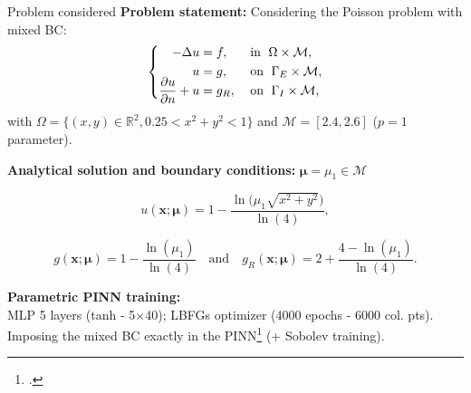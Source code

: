 \begin{frame}{Problem considered} 
	\textbf{Problem statement:} Considering the Poisson problem with mixed BC:
	\vspace{-5pt}
	\begin{equation*}
		\left\{
		\begin{aligned}
			-\Delta u & = f, \; &  & \text{in } \; \Omega \times \mathcal{M}, \\
			u         & = g, \;  &  & \text{on } \; \Gamma_E \times \mathcal{M}, \\
			\smash{\frac{\partial u}{\partial n}}+u  & = g_R, \;  &  & \text{on } \; \Gamma_I \times \mathcal{M},
		\end{aligned}
		\right.
	\end{equation*}

	with $\Omega=\{(x,y)\in\mathbb{R}^2, 0.25 < x^2+y^2 < 1\}$ and $\mathcal{M}=[2.4,2.6]$ ($p=1$ parameter).
		
	\vspace{8pt}
	\textbf{Analytical solution and boundary conditions:} $\bm{\mu}=\mu_1 \in \mathcal{M}$

	\vspace{-12pt}
	\begin{equation*}
		u(\bm{x};\bm{\mu})= 1 - \frac{\ln\big(\mu_1\sqrt{x^2+y^2}\big)}{\ln(4)},
	\end{equation*}

    \vspace{-5pt}
	\begin{equation*}
		g(\bm{x};\bm{\mu})=1 - \frac{\ln(\mu_1)}{\ln(4)} \quad \text{and} \quad g_R(\bm{x};\bm{\mu})=2 + \frac{4-\ln(\mu_1)}{\ln(4)}.
	\end{equation*}

	\vspace{2pt}
	\textbf{Parametric PINN training:} \\
    MLP 5 layers (tanh - 5$\times$40); LBFGs optimizer (4000 epochs - 6000 col. pts). \\
	Imposing the mixed BC exactly in the PINN\footcite{Sukumar_2022} (+ Sobolev training).

	\vspace{8pt}
\end{frame}

